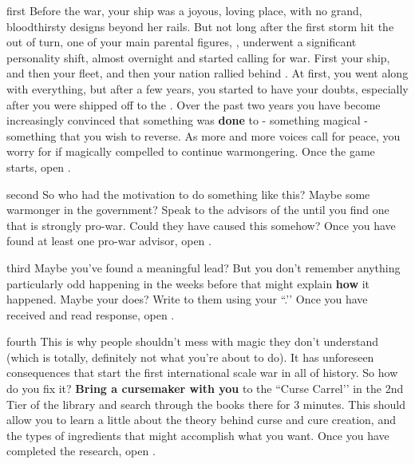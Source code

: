 \documentclass[notebook]{GL2020} %
\begin{document}
\startnotebook{\nWhoCursedWarlord{}}

\begin{page}{first}
Before the war, your ship was a joyous, loving place, with no grand, bloodthirsty designs beyond her rails. But not long after the first storm hit the \pShip{} out of turn, one of your main parental figures, \cLoud{\full}, underwent a significant personality shift, almost overnight and started calling for war. First your ship, and then your fleet, and then your nation rallied behind \cLoud{\them}. At first, you went along with everything, but after a few years, you started to have your doubts, especially after you were shipped off to the \pSchool{}. Over the past two years you have become increasingly convinced that something was \textbf{done} to \cLoud{} - something magical - something that you wish to reverse. As more and more voices call for peace, you worry for \cLoud{} if \cLoud{\theyare} magically compelled to continue warmongering. Once the game starts, open .
\end{page}

\begin{page}{second}
So who had the motivation to do something like this? Maybe some warmonger in the \pShip{} government? Speak to the advisors of the \pShip{} until you find one that is strongly pro-war. Could they have caused this somehow? Once you have found at least one pro-war \pShippie{} advisor, open .
\end{page}

\begin{page}{third}
Maybe you’ve found a meaningful lead? But you don’t remember anything particularly odd happening in the weeks before that might explain \textbf{how} it happened. Maybe your \cQuiet{\parent} \cQuiet{\full} does? Write to them using your ``\aLettersHome{}.’’ Once you have received and read \cQuiet{\their} response, open .
\end{page}

\begin{page}{fourth}
This is why people shouldn't mess with magic they don’t understand (which is totally, definitely not what you’re about to do). It has unforeseen consequences that start the first international scale war in all of history. So how do you fix it? \textbf{Bring a cursemaker with you} to the ``Curse Carrel’’ in the 2nd Tier of the library and search through the books there for 3 minutes. This should allow you to learn a little about the theory behind curse and cure creation, and the types of ingredients that might accomplish what you want. Once you have completed the research, open .
\end{page}
\end{document}
